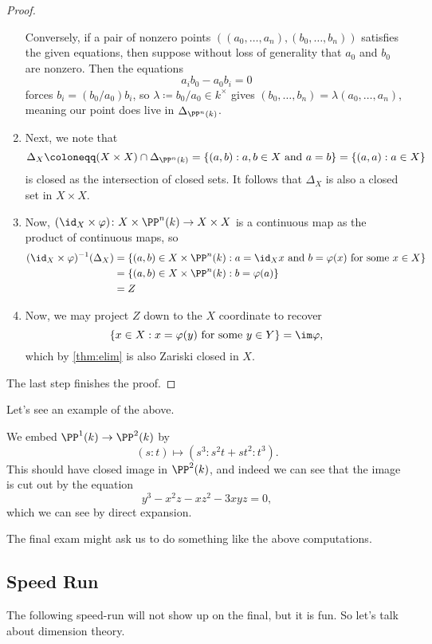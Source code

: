 \documentclass[../notes.tex]{subfiles}
\begin{document}
\begin{proof}
\begin{enumerate}
		Conversely, if a pair of nonzero points $((a_0,\ldots,a_n),(b_0,\ldots,b_n))$ satisfies the given equations, then suppose without loss of generality that $a_0$ and $b_0$ are nonzero. Then the equations
		\[a_ib_0-a_0b_i=0\]
		forces $b_i=(b_0/a_0)b_i$, so $\lambda\coloneqq b_0/a_0\in k^\times$ gives $(b_0,\ldots,b_n)=\lambda(a_0,\ldots,a_n)$, meaning our point does live in $\Delta_{\PP^n(k)}$.
		\item Next, we note that
		\[\Delta_X\coloneqq(X\times X)\cap\Delta_{\PP^n(k)}=\{(a,b):a,b\in X\text{ and }a=b\}=\{(a,a):a\in X\}\]
		is closed as the intersection of closed sets. It follows that $\Delta_X$ is also a closed set in $X\times X$.
		\item Now, $(\id_X\times\varphi)\colon X\times\PP^n(k)\to X\times X$ is a continuous map as the product of continuous maps, so
		\begin{align*}
			(\id_X\times\varphi)^{-1}(\Delta_X) &= \{(a,b)\in X\times\PP^n(k):a=\id_Xx\text{ and }b=\varphi(x)\text{ for some }x\in X\} \\
			&= \{(a,b)\in X\times\PP^n(k):b=\varphi(a)\} \\
			&= Z
		\end{align*}
		\item Now, we may project $Z$ down to the $X$ coordinate to recover
		\[\{x\in X:x=\varphi(y)\text{ for some }y\in Y\}=\im\varphi,\]
		which by \autoref{thm:elim} is also Zariski closed in $X$.
	\end{enumerate}
	The last step finishes the proof.
\end{proof}
Let's see an example of the above.
\begin{ex}
	We embed $\PP^1(k)\to\PP^2(k)$ by
	\[(s:t)\mapsto\left(s^3:s^2t+st^2:t^3\right).\]
	This should have closed image in $\PP^2(k)$, and indeed we can see that the image is cut out by the equation
	\[y^3-x^2z-xz^2-3xyz=0,\]
	which we can see by direct expansion.
\end{ex}
\begin{remark}
	The final exam might ask us to do something like the above computations.
\end{remark}

\subsection{Speed Run}
The following speed-run will not show up on the final, but it is fun. So let's talk about dimension theory.
\end{document}
